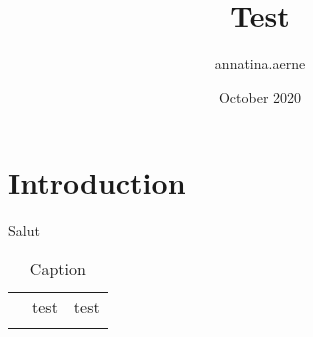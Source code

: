 \documentclass{article}
\title{Test}
\author{annatina.aerne }
\date{October 2020}
\begin{document}
\maketitle

\section{Introduction}
Salut
\begin{table}[]
    \centering
    \begin{tabular}{c|c|c}
         &  test & test\\
         & &
    \end{tabular}
    \caption{Caption}
    \label{tab:my_label}
\end{table}
\end{document}
